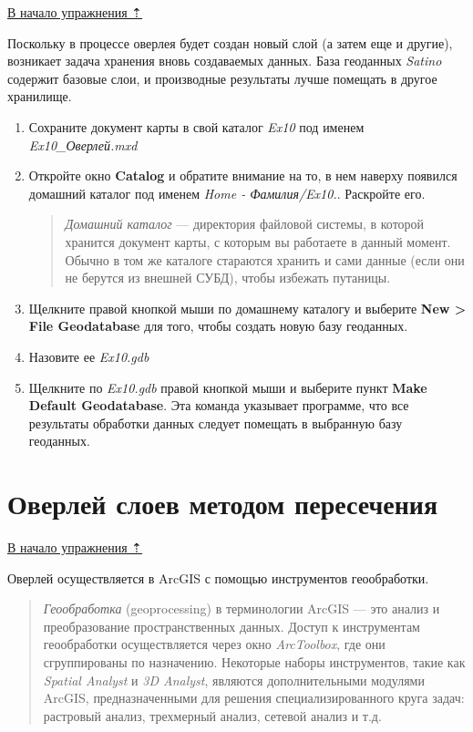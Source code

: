 \documentclass[12pt,]{book}
\begin{document}
\protect\hyperlink{overlay}{В начало упражнения ⇡}

Поскольку в процессе оверлея будет создан новый слой (а затем еще и другие), возникает задача хранения вновь создаваемых данных. База геоданных \emph{Satino} содержит базовые слои, и производные результаты лучше помещать в другое хранилище.

\begin{enumerate}
\def\labelenumi{\arabic{enumi}.}
\item
  Сохраните документ карты в свой каталог \emph{Ex10} под именем \emph{Ex10\_Оверлей.mxd}
\item
  Откройте окно \textbf{Catalog} и обратите внимание на то, в нем наверху появился домашний каталог под именем \emph{Home - Фамилия/Ex10.}. Раскройте его.

  \begin{quote}
  \emph{Домашний каталог} --- директория файловой системы, в которой хранится документ карты, с которым вы работаете в данный момент. Обычно в том же каталоге стараются хранить и сами данные (если они не берутся из внешней СУБД), чтобы избежать путаницы.
  \end{quote}
\item
  Щелкните правой кнопкой мыши по домашнему каталогу и выберите \textbf{New \textgreater{} File Geodatabase} для того, чтобы создать новую базу геоданных.
\item
  Назовите ее \emph{Ex10.gdb}
\item
  Щелкните по \emph{Ex10.gdb} правой кнопкой мыши и выберите пункт \textbf{Make Default Geodatabase}. Эта команда указывает программе, что все результаты обработки данных следует помещать в выбранную базу геоданных.
\end{enumerate}

\hypertarget{overlay-intersect}{%
\section{Оверлей слоев методом пересечения}\label{overlay-intersect}}

\protect\hyperlink{overlay}{В начало упражнения ⇡}

Оверлей осуществляется в ArcGIS с помощью инструментов геообработки.

\begin{quote}
\emph{Геообработка} (geoprocessing) в терминологии ArcGIS --- это анализ и преобразование пространственных данных. Доступ к инструментам геообработки осуществляется через окно \emph{ArcToolbox}, где они сгруппированы по назначению. Некоторые наборы инструментов, такие как \emph{Spatial Analyst} и \emph{3D Analyst}, являются дополнительными модулями ArcGIS, предназначенными для решения специализированного круга задач: растровый анализ, трехмерный анализ, сетевой анализ и т.д.
\end{quote}
\end{document}
